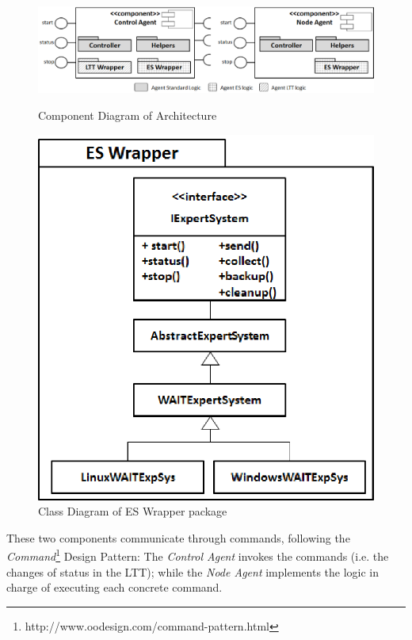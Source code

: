 \documentclass[runningheads,a4paper]{llncs}
\begin{document}
\begin{figure}
\centering
\begin{minipage}[b]{.67\textwidth}

\centering
\includegraphics[totalheight=.23\textheight,width=1.0\textwidth]{Components}
\caption{Component Diagram of Architecture}
\label{fig_components}

\end{minipage}\qquad
\begin{minipage}[b]{.27\textwidth}

\centering
\includegraphics[totalheight=.25\textheight,width=1.0\textwidth]{Wrapper}
\caption{Class Diagram of ES Wrapper package}
\label{fig_wrapper}

\end{minipage}
\end{figure}

These two components communicate through commands, following the
\emph{Command}\footnote{http://www.oodesign.com/command-pattern.html} Design
Pattern: The \emph{Control Agent} invokes the commands (i.e. the changes of
status in the LTT); while the \emph{Node Agent} implements the logic in charge
of executing each concrete command. 
\end{document}
